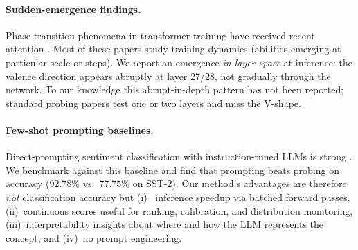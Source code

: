 \paragraph{Sudden-emergence findings.}
Phase-transition phenomena in transformer training have received recent
attention \cite{olsson2022induction, wei2022emergent, michaud2024quantization}.
Most of these papers study training dynamics (abilities emerging at particular
scale or steps). We report an emergence \emph{in layer space} at inference: the
valence direction appears abruptly at layer 27/28, not gradually through the
network. To our knowledge this abrupt-in-depth pattern has not been reported;
standard probing papers test one or two layers and miss the V-shape.

\paragraph{Few-shot prompting baselines.}
Direct-prompting sentiment classification with instruction-tuned LLMs is
strong \cite{brown2020language, wei2022finetuned}. We benchmark against this
baseline and find that prompting beats probing on accuracy (92.78\% vs.\
77.75\% on SST-2). Our method's advantages are therefore \emph{not}
classification accuracy but (i)~\speedup{} inference speedup via batched
forward passes, (ii)~continuous scores useful for ranking, calibration, and
distribution monitoring, (iii)~interpretability insights about where and how
the LLM represents the concept, and (iv)~no prompt engineering.
